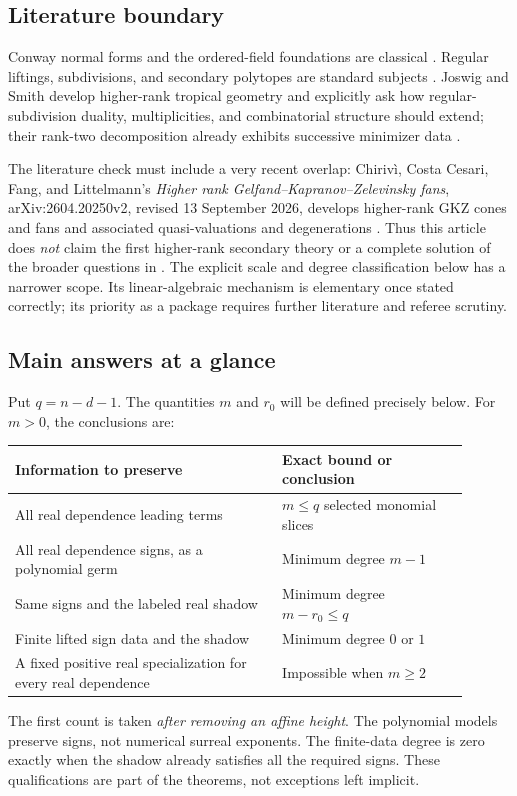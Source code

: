 \documentclass[11pt,a4paper]{article}
\numberwithin{equation}{section}
\theoremstyle{plain}
\begin{document}
\subsection{Literature boundary}

Conway normal forms and the ordered-field foundations are classical
\cite{fs:Gonshor}. Regular liftings, subdivisions, and secondary polytopes are
standard subjects \cite{fs:DRS}. Joswig and Smith develop higher-rank tropical
geometry and explicitly ask how regular-subdivision duality, multiplicities,
and combinatorial structure should extend; their rank-two decomposition
already exhibits successive minimizer data \cite{fs:JS}.

The literature check must include a very recent overlap: Chiriv\`i,
Costa Cesari, Fang, and Littelmann's \emph{Higher rank
Gelfand--Kapranov--Zelevinsky fans}, arXiv:2604.20250v2, revised
13 September 2026, develops higher-rank GKZ cones and fans and associated
quasi-valuations and degenerations \cite{fs:CCFL}. Thus this article does
\emph{not} claim the first higher-rank secondary theory or a complete
solution of the broader questions in \cite{fs:JS}. The explicit scale and
degree classification below has a narrower scope. Its linear-algebraic
mechanism is elementary once stated correctly; its priority as a package
requires further literature and referee scrutiny.

\subsection{Main answers at a glance}

Put $q=n-d-1$. The quantities $m$ and $r_0$ will be defined precisely below.
For $m>0$, the conclusions are:
\begin{center}
\small
\begin{tabular}{@{}p{0.53\linewidth}p{0.37\linewidth}@{}}
\toprule
Information to preserve & Exact bound or conclusion\\
\midrule
All real dependence leading terms & $m\le q$ selected monomial slices\\
All real dependence signs, as a polynomial germ & Minimum degree $m-1$\\
Same signs and the labeled real shadow & Minimum degree $m-r_0\le q$\\
Finite lifted sign data and the shadow & Minimum degree $0$ or $1$\\
A fixed positive real specialization for every real dependence & Impossible when $m\ge2$\\
\bottomrule
\end{tabular}
\end{center}
The first count is taken \emph{after removing an affine height}. The
polynomial models preserve signs, not numerical surreal exponents.
The finite-data degree is zero exactly when the shadow already satisfies
all the required signs. These qualifications are part of the theorems,
not exceptions left implicit.
\end{document}
